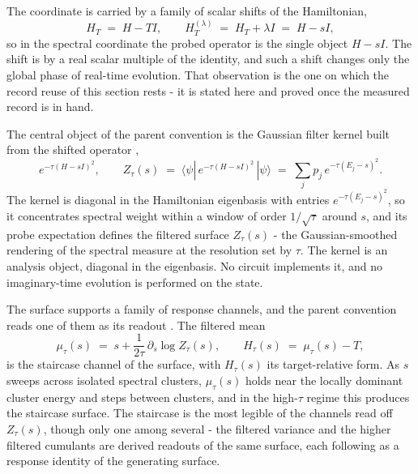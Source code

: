 The coordinate is carried by a family of scalar shifts of the Hamiltonian,
\begin{equation}\label{def:hamiltonian-shift}
H_T \;=\; H - T I, \qquad H_T^{(\lambda)} \;=\; H_T + \lambda I \;=\; H - s I,
\end{equation}
so in the spectral coordinate the probed operator is the single object $H - sI$. The shift is by a real scalar multiple of the identity, and such a shift changes only the global phase of real-time evolution. That observation is the one on which the record reuse of this section rests - it is stated here and proved once the measured record is in hand.

The central object of the parent convention is the Gaussian filter kernel built from the shifted operator \cite{mccaul2025snacks},
\begin{equation}\label{def:filter-kernel}
e^{-\tau (H - sI)^2}, \qquad Z_\tau(s) \;=\; \langle\psi|\,e^{-\tau (H - sI)^2}\,|\psi\rangle \;=\; \sum_j p_j\,e^{-\tau (E_j - s)^2}.
\end{equation}
The kernel is diagonal in the Hamiltonian eigenbasis with entries $e^{-\tau(E_j - s)^2}$, so it concentrates spectral weight within a window of order $1/\sqrt{\tau}$ around $s$, and its probe expectation defines the filtered surface $Z_\tau(s)$ - the Gaussian-smoothed rendering of the spectral measure at the resolution set by $\tau$. The kernel is an analysis object, diagonal in the eigenbasis. No circuit implements it, and no imaginary-time evolution is performed on the state.

The surface supports a family of response channels, and the parent convention reads one of them as its readout \cite{mccaul2025snacks}. The filtered mean
\begin{equation}\label{def:staircase}
\mu_\tau(s) \;=\; s + \frac{1}{2\tau}\,\partial_s \log Z_\tau(s), \qquad H_\tau(s) \;=\; \mu_\tau(s) - T,
\end{equation}
is the staircase channel of the surface, with $H_\tau(s)$ its target-relative form. As $s$ sweeps across isolated spectral clusters, $\mu_\tau(s)$ holds near the locally dominant cluster energy and steps between clusters, and in the high-$\tau$ regime this produces the staircase surface. The staircase is the most legible of the channels read off $Z_\tau(s)$, though only one among several - the filtered variance and the higher filtered cumulants are derived readouts of the same surface, each following as a response identity of the generating surface.

